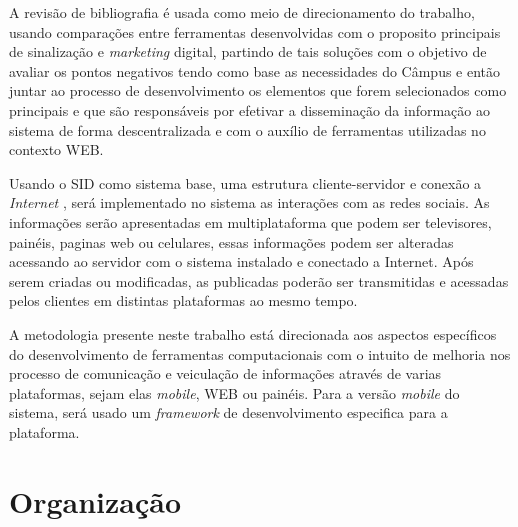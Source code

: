 A revisão de bibliografia é usada como meio de direcionamento do trabalho, usando comparações entre ferramentas desenvolvidas com o proposito principais de sinalização e \textit{marketing} digital, partindo de tais soluções com o objetivo de avaliar os pontos negativos tendo como base as necessidades do Câmpus e então juntar ao processo de desenvolvimento os elementos que forem selecionados como principais e que são responsáveis por efetivar a disseminação da informação ao sistema de forma descentralizada e com o auxílio de ferramentas utilizadas no contexto WEB.
	 
Usando o SID como sistema base, uma estrutura cliente-servidor e conexão a \textit{Internet} , será implementado no sistema as interações com as redes sociais. As informações serão apresentadas em multiplataforma que podem ser televisores, painéis, paginas web ou celulares, essas informações podem ser alteradas acessando ao servidor com o sistema instalado e conectado a Internet. Após serem criadas ou modificadas, as publicadas poderão ser transmitidas e acessadas pelos clientes em distintas plataformas ao mesmo tempo.

A metodologia presente neste trabalho está direcionada aos aspectos específicos do desenvolvimento de ferramentas computacionais com o intuito de melhoria nos processo de comunicação e veiculação de informações através de varias plataformas, sejam elas \textit{mobile}, WEB ou painéis. Para a versão \textit{mobile} do sistema, será usado um \textit{framework} de desenvolvimento especifica para a plataforma.

\section{Organização}
